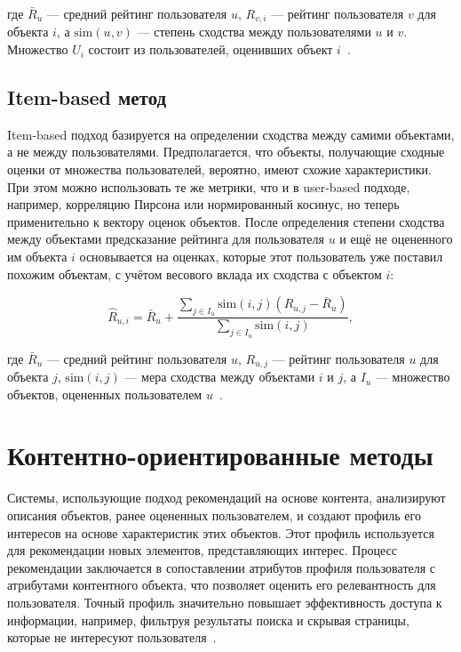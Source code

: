 где \(\bar{R}_u\) — средний рейтинг пользователя \(u\), \(R_{v,i}\) — рейтинг пользователя \(v\) для объекта \(i\),
а \(\text{sim}(u,v)\) — степень сходства между пользователями \(u\) и \(v\). Множество \(U_i\) состоит из пользователей,
оценивших объект \(i\)~\cite{col_rek}.

\subsection*{Item-based метод}

Item-based подход базируется на определении сходства между самими объектами, а не между пользователями.
Предполагается, что объекты, получающие сходные оценки от множества пользователей, вероятно, имеют схожие характеристики.
При этом можно использовать те же метрики, что и в user-based подходе, например, корреляцию Пирсона или нормированный
косинус, но теперь применительно к вектору оценок объектов. После определения степени сходства между объектами
предсказание рейтинга для пользователя \(u\) и ещё не оцененного им объекта \(i\) основывается на оценках,
которые этот пользователь уже поставил похожим объектам, с учётом весового вклада их сходства с объектом \(i\):

\begin{equation}
\hat{R}_{u,i} = \bar{R}_u + \frac{\sum_{j \in I_u} \text{sim}(i,j)(R_{u,j}-\bar{R}_u)}{\sum_{j \in I_u} \text{sim}(i,j)},
\end{equation}

где \(\bar{R}_u\) — средний рейтинг пользователя \(u\), \(R_{u,j}\) — рейтинг пользователя \(u\) для объекта \(j\),
\(\text{sim}(i,j)\) — мера сходства между объектами \(i\) и \(j\), а \(I_u\) — множество объектов, оцененных пользователем
\(u\)~\cite{col_rek}.

\section{Контентно-ориентированные методы}

Системы, использующие подход рекомендаций на основе контента, анализируют описания объектов,
ранее оцененных пользователем, и создают профиль его интересов на основе характеристик этих объектов.
Этот профиль используется для рекомендации новых элементов, представляющих интерес.
Процесс рекомендации заключается в сопоставлении атрибутов профиля пользователя с атрибутами контентного объекта,
что позволяет оценить его релевантность для пользователя.
Точный профиль значительно повышает эффективность доступа к информации, например,
фильтруя результаты поиска и скрывая страницы, которые не интересуют пользователя~\cite{def_rec}.

